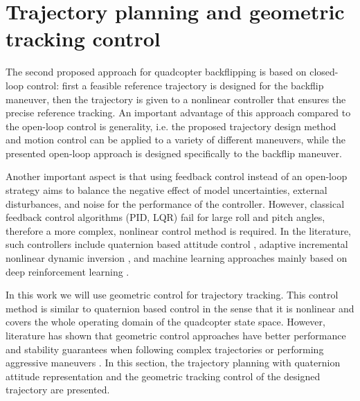 \section{Trajectory planning and geometric tracking control}

The second proposed approach for quadcopter backflipping is based on closed-loop control: first a feasible reference trajectory is designed for the backflip maneuver, then the trajectory is given to a nonlinear controller that ensures the precise reference tracking. An important advantage of this approach compared to the open-loop control is generality, i.e. the proposed trajectory design method and motion control can be applied to a variety of different maneuvers, while the presented open-loop approach is designed specifically to the backflip maneuver.

Another important aspect is that using feedback control instead of an open-loop strategy aims to balance the negative effect of model uncertainties, external disturbances, and noise for the performance of the controller. However, classical feedback control algorithms (PID, LQR) fail for large roll and pitch angles, therefore a more complex, nonlinear control method is required. In the literature, such controllers include quaternion based attitude control \cite{quaternion}, adaptive incremental nonlinear dynamic inversion \cite{indi2015}, and machine learning approaches mainly based on deep reinforcement learning \cite{drone-racing-deep-rl,deep_acrobatics, quadrotor-control-rl}. 

In this work we will use geometric control for trajectory tracking. This control method is similar to quaternion based control in the sense that it is nonlinear and covers the whole operating domain of the quadcopter state space. However, literature has shown that geometric control approaches have better performance and stability guarantees when following complex trajectories or performing aggressive maneuvers \cite{lelemc2010, turpinkumar2011, mellinger2011}. In this section, the trajectory planning with quaternion attitude representation and the geometric tracking control of the designed trajectory are presented.

